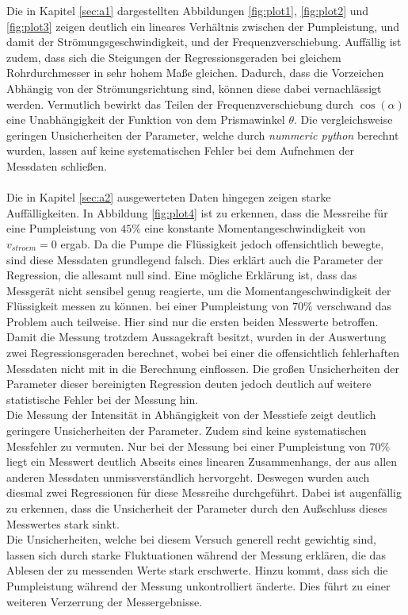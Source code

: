 Die in Kapitel \ref{sec:a1} dargestellten Abbildungen \ref{fig:plot1}, \ref{fig:plot2} und \ref{fig:plot3} zeigen deutlich ein lineares Verhältnis
zwischen der Pumpleistung, und damit der Strömungsgeschwindigkeit, und der Frequenzverschiebung. Auffällig ist zudem, dass sich die Steigungen der 
Regressionsgeraden bei gleichem Rohrdurchmesser in sehr hohem Maße gleichen. Dadurch, dass die Vorzeichen Abhängig von der Strömungsrichtung sind,
können diese dabei vernachlässigt werden. Vermutlich bewirkt das Teilen der Frequenzverschiebung durch $\cos(\alpha)$ eine Unabhängigkeit der 
Funktion von dem Prismawinkel $\theta$. Die vergleichsweise geringen Unsicherheiten der Parameter, welche durch \textit{nummeric python} \cite{numpy}
berechnt wurden, lassen auf keine systematischen Fehler bei dem Aufnehmen der Messdaten schließen. 
\\\\\noindent
Die in Kapitel \ref{sec:a2} ausgewerteten Daten hingegen zeigen starke Auffälligkeiten. In Abbildung \ref{fig:plot4} ist zu erkennen, dass die 
Messreihe für eine Pumpleistung von $45\%$ eine konstante Momentangeschwindigkeit von $v_{stroem}=0$ ergab. Da die Pumpe die Flüssigkeit jedoch
offensichtlich bewegte, sind diese Messdaten grundlegend falsch. Dies erklärt auch die Parameter der Regression, die allesamt null sind. Eine 
mögliche Erklärung ist, dass das Messgerät nicht sensibel genug reagierte, um die Momentangeschwindigkeit der Flüssigkeit messen zu können. 
bei einer Pumpleistung von $70\%$ verschwand das Problem auch teilweise. Hier sind nur die ersten beiden Messwerte betroffen. Damit die 
Messung trotzdem Aussagekraft besitzt, wurden in der Auswertung zwei Regressionsgeraden berechnet, wobei bei einer die offensichtlich fehlerhaften
Messdaten nicht mit in die Berechnung einflossen. Die großen Unsicherheiten der Parameter dieser bereinigten Regression deuten jedoch deutlich auf
weitere statistische Fehler bei der Messung hin.
\\\noindent
Die Messung der Intensität in Abhängigkeit von der Messtiefe zeigt deutlich geringere Unsicherheiten der Parameter. Zudem sind keine systematischen
Messfehler zu vermuten. Nur bei der Messung bei einer Pumpleistung von $70\%$ liegt ein Messwert deutlich Abseits eines linearen Zusammenhangs, der 
aus allen anderen Messdaten unmissverständlich hervorgeht. Deswegen wurden auch diesmal zwei Regressionen für diese Messreihe durchgeführt. Dabei 
ist augenfällig zu erkennen, dass die Unsicherheit der Parameter durch den Außschluss dieses Messwertes stark sinkt.
\\\noindent
Die Unsicherheiten, welche bei diesem Versuch generell recht gewichtig sind, lassen sich durch starke Fluktuationen während der Messung erklären,
die das Ablesen der zu messenden Werte stark erschwerte. Hinzu kommt, dass sich die Pumpleistung während der Messung unkontrolliert änderte. Dies
führt zu einer weiteren Verzerrung der Messergebnisse.